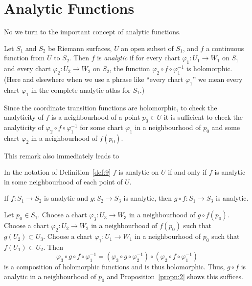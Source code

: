 \documentclass[a4paper,11pt]{article}
\begin{document}
\section{Analytic Functions}

No we turn to the important concept of analytic functions.

\begin{defn}
  \label{def:9}
  Let $S_1$ and $S_2$ be Riemann surfaces, $U$ an open subset of
  $S_1$, and $f$ a continuous function from  $U$ to $S_2$. Then $f$ is
  \emph{analytic} if for every chart $\varphi_1 : U_1 \to W_1$ on
  $S_1$ and every chart $\varphi_2 : U_2 \to W_2$ on $S_2$, the
  function $\varphi_2 \circ f \circ \varphi_1^{-1}$ is holomorphic.
  (Here and elsewhere when we use a phrase like ``every chart
  $\varphi_1$'' we mean every chart $\varphi_1$ in the complete
  analytic atlas for $S_1$.)
\end{defn}

\begin{rem}
  Since the coordinate transition functions are holomorphic, to check
  the analyticity of $f$ is a neighbourhood of a point $p_0 \in U$ it
  is sufficient to check the analyticity of $\varphi_2 \circ f \circ
  \varphi_1^{-1}$ for some chart $\varphi_1$ in a neighbourhood of
  $p_0$ and some chart $\varphi_2$ in a neighbourhood of $f(p_0)$.
\end{rem}

This remark also immediately leads to 

\begin{propn}
  \label{propn:2}
  In the notation of Definition~\ref{def:9} $f$ is analytic on $U$ if
  and only if $f$ is analytic in some neighbourhood of each point of
  $U$.
\end{propn}

\begin{propn}
  If $f : S_1 \to S_2$ is analytic and $g : S_2 \to S_3$ is analytic,
  then $g \circ f : S_1 \to S_3$ is analytic.
\end{propn}

\begin{myproof}
  Let $p_0 \in S_1$.  Choose a chart $\varphi_3 : U_3 \to W_3$ in a
  neighbourhood of $g\circ f(p_0)$.  Choose a chart $\varphi_2 : U_2
  \to W_2$ in a neighbourhood of $f(p_0)$ such that $g(U_2) \subset
  U_3$.  Choose a chart $\varphi_1 : U_1 \to W_1$ in a neighbourhood
  of $p_0$ such that $f(U_1) \subset U_2$.  Then
  $$
  \varphi_3 \circ g \circ f \circ \varphi_1^{-1}
  = (\varphi_3 \circ g \circ \varphi_2^{-1}) \circ
  (\varphi_2 \circ f \circ \varphi_1^{-1})
  $$
  is a composition of holomorphic functions and is thus holomorphic.
  Thus, $g \circ f$ is analytic in a neighbourhood of $p_0$ and
  Proposition~\ref{propn:2} shows this suffices.
\end{myproof}
\end{document}
